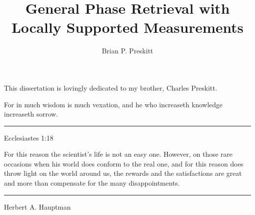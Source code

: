 \documentclass[12pt]{ucsd-thesis}
\title{General Phase Retrieval with Locally Supported Measurements}
\author{Brian P. Preskitt}
\begin{document}
\begin{frontmatter}

\maketitle

\copyrightpage

\approvalpage

\begin{dedication}
This dissertation is lovingly dedicated to my brother, Charles Preskitt.
\end{dedication}

\begin{epigraph}
  \begin{minipage}{.3\textwidth}
    \hfill
  \end{minipage}
  \begin{minipage}{.7\textwidth}
  \begin{flushleft}
    For in much wisdom is much vexation, and he who increaseth knowledge increaseth sorrow. \\%
  \end{flushleft}
  \begin{flushright}
    \rule[.5ex]{1cm}{.1pt} Ecclesiastes 1:18
  \end{flushright}
  \end{minipage}
  
  \begin{minipage}{.3\textwidth}
    \hfill
  \end{minipage}
  \begin{minipage}{.7\textwidth}
    \begin{flushleft}
      For this reason the scientist's life is not an easy one.  However, on those rare occasions when his world does conform to the real one, and for this reason does throw light on the world around us, the rewards and the satisfactions are great and more than compensate for the many disappointments.
    \end{flushleft}
    \begin{flushright}
      \rule[.5ex]{1cm}{.1pt} Herbert A. Hauptman
    \end{flushright}
  \end{minipage}
\end{epigraph}


\end{frontmatter}
\end{document}
